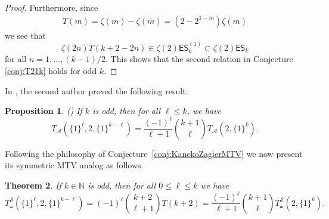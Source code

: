 \documentclass{article}
\newcommand{\ES}{\mathsf {ES}}
\newcommand{\sha}{\shuffle}
\newcommand{\Sy}{{\mathcal S}}
\newcommand{\calA}{\mathcal{A}}
\newcommand{\N}{\mathbb{N}}
\newcommand{\ol}{\overline}
\theoremstyle{plain}
\newtheorem{thm}{Theorem}[section]
\newtheorem{prop}[thm]{Proposition}
\theoremstyle{definition}
\begin{document}
\begin{proof}
Furthermore, since
\begin{align*}
T(m)=\zeta(m)-\zeta(\ol{m})=(2-2^{1-m})\zeta(m)
\end{align*}
we see that
\begin{equation*}
\zeta(2n)T(k+2-2n)\in \zeta(2)\ES_{k}^{(1)} \subset \zeta(2)\ES_{k}
\end{equation*}
for all $n=1,\dots,(k-1)/2.$ This shows that the second relation in Conjecture \ref{conj:T21k} holds for odd $k$.
\end{proof}

In \cite[Prop. 3]{Zhao2023Dec}, the second author proved the following result.

\begin{prop}\label{prop:FMT1ell2lk} \emph{(\cite[Prop. 3]{Zhao2023Dec})}
If $k$ is odd, then for all $\ell \le k$, we have
\begin{equation}\label{equ:FMT121}
T_\calA(\{1\}^\ell,2,\{1\}^{k-\ell})=\frac{(-1)^{\ell}}{\ell+1} \binom{k+1}{\ell}  T_\calA(2,\{1\}^k).
\end{equation}
\end{prop}

Following the philosophy of Conjecture~\ref{conj:KanekoZagierMTV} we now present its symmetric MTV analog as follows.

\begin{thm}  \label{thm:SMT121}
If $k\in\N$ is odd, then for all $0\le \ell \le k$ we have
\begin{equation}\label{equ:SMT121}
T_\sha^\Sy(\{1\}^\ell,2,\{1\}^{k-\ell})=(-1)^{\ell}\binom{k+2}{\ell+1} T(k+2)
    =\frac{(-1)^{\ell}}{\ell+1} \binom{k+1}{\ell}  T_\sha^\Sy(2,\{1\}^k).
\end{equation}
\end{thm}
\end{document}
